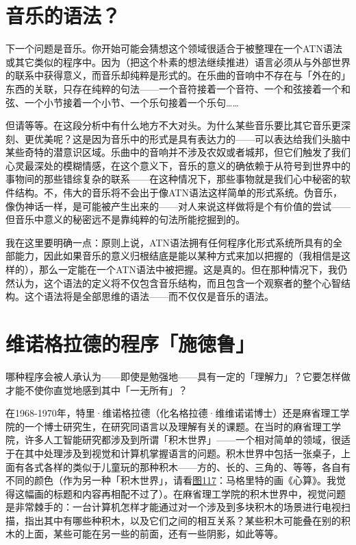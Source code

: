 \documentclass[
  12pt,
  twoside,
  openright,
  oldfontcommands,
]{memoir}
\begin{document}
\section{音乐的语法？}

下一个问题是音乐。你开始可能会猜想这个领域很适合于被整理在一个ATN语法或其它类似的程序中。因为（把这个朴素的想法继续推进）语言必须从与外部世界的联系中获得意义，而音乐却纯粹是形式的。在乐曲的音响中不存在与「外在的」东西的关联，只存在纯粹的句法------一个音符接着一个音符、一个和弦接着一个和弦、一个小节接着一个小节、一个乐句接着一个乐句\ldots\ldots{}

但请等等。在这段分析中有什么地方不大对头。为什么某些音乐要比其它音乐更深刻、更优美呢？这是因为音乐中的形式是具有表达力的------可以表达给我们头脑中某些奇特的潜意识区域。乐曲中的音响并不涉及农奴或者城邦，但它们触发了我们心灵最深处的模糊情感，在这个意义下，音乐的意义的确依赖于从符号到世界中的事物间的那些错综复杂的联系------在这种情况下，那些事物就是我们心中秘密的软件结构。不，伟大的音乐将不会出于像ATN语法这样简单的形式系统。伪音乐，像伪神话一样，是可能被产生出来的------对人来说这样做将是个有价值的尝试------但音乐中意义的秘密远不是靠纯粹的句法所能挖掘到的。

我在这里要明确一点：原则上说，ATN语法拥有任何程序化形式系统所具有的全部能力，因此如果音乐的意义归根结底是能以某种方式来加以把握的（我相信是这样的），那么一定能在一个ATN语法中被把握。这是真的。但在那种情况下，我仍然认为，这个语法的定义将不仅包含音乐结构，而且包含一个观察者的整个心智结构。这个语法将是全部思维的语法------而不仅仅是音乐的语法。

\section{维诺格拉德的程序「施徳鲁」}

哪种程序会被人承认为------即使是勉强地------具有一定的「理解力」？它要怎样做才能不使你直觉地感到其中「一无所有」？

在1968-1970年，特里·维诺格拉德（化名格拉德·维维诺诺博士）还是麻省理工学院的一个博士研究生，在研究同语言以及理解有关的课题。在当时的麻省理工学院，许多人工智能研究都涉及到所谓「积木世界」------一个相对简单的领域，很适于在其中处理涉及到视觉和计算机掌握语言的问题。积木世界中包括一张桌子，上面有各式各样的类似于儿童玩的那种积木------方的、长的、三角的、等等，各自有不同的颜色（作为另一种「积木世界」，请看\hyperref[fig:117]{图117}：马格里特的画《心算》。我觉得这幅画的标题和内容再相配不过了）。在麻省理工学院的积木世界中，视觉问题是非常棘手的：一台计算机怎样才能通过对一个涉及到多块积木的场景进行电视扫描，指出其中有哪些种积木，以及它们之间的相互关系？某些积木可能叠在别的积木的上面，某些可能在另一些的前面，还有一些阴影，如此等等。
\end{document}
